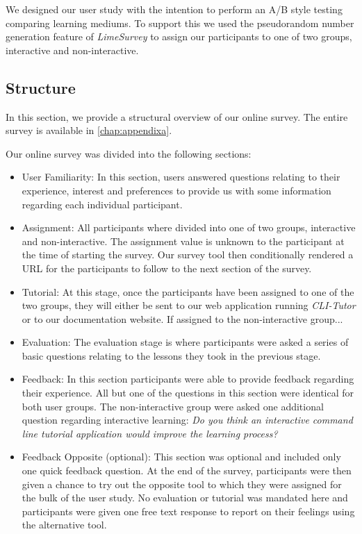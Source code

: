 We designed our user study with the intention to perform an A/B style testing
comparing learning mediums. To support this we used the pseudorandom number
generation feature of \textit{LimeSurvey} to assign our participants to one of
two groups, interactive and non-interactive.

\subsection{Structure}

In this section, we provide a structural overview of our online survey. The
entire survey is available in \autoref{chap:appendixa}.

Our online survey was divided into the following sections:

\begin{itemize}

    \item User Familiarity: In this section, users answered questions relating
        to their experience, interest and preferences to provide us with some
        information regarding each individual participant.

    \item Assignment: All participants where divided into one of two groups,
        interactive and non-interactive. The assignment value is unknown to the
        participant at the time of starting the survey. Our survey tool then
        conditionally rendered a URL for the participants to follow to the next
        section of the survey.

    \item Tutorial: At this stage, once the participants have been assigned to
        one of the two groups, they will either be sent to our web application
        running \textit{CLI-Tutor} or to our documentation website. If assigned
        to the non-interactive group...

    \item Evaluation: The evaluation stage is where participants were asked a
        series of basic questions relating to the lessons they took in the
        previous stage.

    \item Feedback: In this section participants were able to provide feedback
        regarding their experience. All but one of the questions in this
        section were identical for both user groups. The non-interactive group
        were asked one additional question regarding interactive learning: \textit{Do 
        you think an interactive command line tutorial application would
    improve the learning process?}

    \item Feedback Opposite (optional): This section was optional and included
        only one quick feedback question. At the end of the survey,
        participants were then given a chance to try out the opposite tool to
        which they were assigned for the bulk of the user study. No evaluation
        or tutorial was mandated here and participants were given one free text
        response to report on their feelings using the alternative tool.
\end{itemize}


